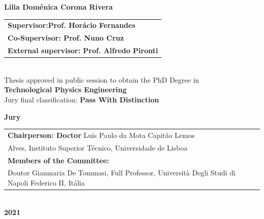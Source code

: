 {\vspace{0.8cm}
{\FontNam \textbf{Lilia Dom\'enica Corona Rivera}} \\
\vspace{0.8cm}
{\FontS %
\begin{tabular}{l}
	\FontL
\textbf{Supervisor:Prof. Hor\'acio Fernandes} \\
	\FontL\textbf{Co-Supervisor: Prof. Nuno Cruz}\\
	\FontL\textbf{External supervisor: Prof. Alfredo Pironti}\\
\end{tabular} } \\
\vspace{0.8cm}
{\FontM Thesis approved in public session to obtain the PhD Degree in} \\
\vspace{0.8mm}
{\FontL \textbf{Technological Physics Engineering}} \\
\vspace{0.8cm}
{\FontL Jury final classification: \textbf{Pass With Distinction}}\\
\vspace{1.0cm}

{\FontL \textbf{Jury}}\\
\vspace{0.8cm}

{\FontS %
	\begin{tabular}{l}
		\FontL
		\textbf{Chairperson: Doctor} Luís Paulo da Mota Capitão Lemos \\ 	\FontL Alves, Instituto  Superior  Técnico,  Universidade  de Lisboa \\
		
		\FontL\textbf{Members of the Committee:}\\
	\FontL	Doutor Gianmaria De Tommasi, Full Professor, Università Degli Studi di Napoli Federico II, Itália \\
		

\end{tabular} } \\

\vspace{1.2cm}
{\FontM \textbf{2021}} \\

\endgroup}



